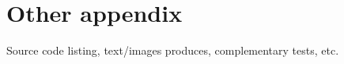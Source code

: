\chapter{Other appendix}
\label{apendice2}

Source code listing, text/images produces, complementary tests, etc.

